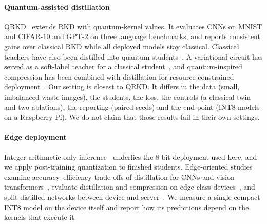 \paragraph{Quantum-assisted distillation}
QRKD~\citep{liu2025qrkd} extends RKD with quantum-kernel values. It evaluates CNNs on MNIST and CIFAR-10 and GPT-2 on three language benchmarks, and reports consistent gains over classical RKD while all deployed models stay classical.
Classical teachers have also been distilled into quantum students~\citep{li2024hybrid,hasan2023bridging}. A variational circuit has served as a soft-label teacher for a classical student~\citep{naqvi2026structured}, and quantum-inspired compression has been combined with distillation for resource-constrained deployment~\citep{kumar2026quantuminspired}.
Our setting is closest to QRKD. It differs in the data (small, imbalanced waste images), the students, the loss, the controls (a classical twin and two ablations), the reporting (paired seeds) and the end point (INT8 models on a Raspberry Pi).
We do not claim that those results fail in their own settings.

\paragraph{Edge deployment}
Integer-arithmetic-only inference~\citep{jacob2018quantization} underlies the 8-bit deployment used here, and we apply post-training quantization to finished students.
Edge-oriented studies examine accuracy--efficiency trade-offs of distillation for CNNs and vision transformers~\citep{violos2024towards}, evaluate distillation and compression on edge-class devices~\citep{paparounas2024evaluating}, and split distilled networks between device and server~\citep{matsubara2020head}.
We measure a single compact INT8 model on the device itself and report how its predictions depend on the kernels that execute it.
